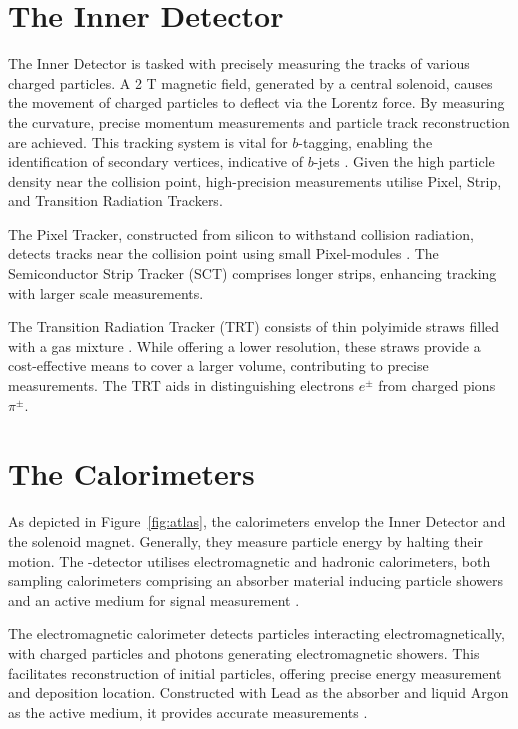 \documentclass[bachelor,ngerman,english]{GAUBM}
\begin{document}
\section*{The Inner Detector}
The Inner Detector is tasked with precisely measuring the tracks of various charged particles. A 2 T magnetic field, generated by a central solenoid, causes the movement of charged particles to deflect via the Lorentz force. By measuring the curvature, precise momentum measurements and particle track reconstruction are achieved. This tracking system is vital for $b$-tagging, enabling the identification of secondary vertices, indicative of $b$-jets \cite{atlas}. Given the high particle density near the collision point, high-precision measurements utilise Pixel, Strip, and Transition Radiation Trackers.

The Pixel Tracker, constructed from silicon to withstand collision radiation, detects tracks near the collision point using small Pixel-modules \cite{atlas}. The Semiconductor Strip Tracker (SCT) comprises longer strips, enhancing tracking with larger scale measurements.

The Transition Radiation Tracker (TRT) consists of thin polyimide straws filled with a gas mixture \cite{atlas}. While offering a lower resolution, these straws provide a cost-effective means to cover a larger volume, contributing to precise measurements. The TRT aids in distinguishing electrons $e^\pm$ from charged pions $\pi^\pm$.

\section*{The Calorimeters}
As depicted in Figure~\ref{fig:atlas}, the calorimeters envelop the Inner Detector and the solenoid magnet. Generally, they measure particle energy by halting their motion. The \atlas-detector utilises electromagnetic and hadronic calorimeters, both sampling calorimeters comprising an absorber material inducing particle showers and an active medium for signal measurement \cite{atlas_calorimeter}.

The electromagnetic calorimeter detects particles interacting electromagnetically, with charged particles and photons generating electromagnetic showers. This facilitates reconstruction of initial particles, offering precise energy measurement and deposition location. Constructed with Lead as the absorber and liquid Argon as the active medium, it provides accurate measurements \cite{atlas_calorimeter}.
\end{document}
